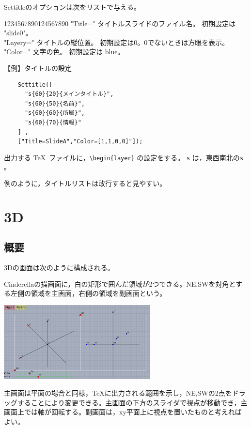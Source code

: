 \documentclass[papersize,a4paper,12pt,uplatex]{jsarticle}
\begin{document}
\begin{description}
Settitleのオプションは次をリストで与える。

\begin{tabbing}
123456789012\=4567890\=\kill
"Title=" \> タイトルスライドのファイル名。 初期設定は "slide0"。\\
"Layery=" \> タイトルの縦位置。 初期設定は0。0でないときは方眼を表示。 \\
"Color="\> 文字の色。 初期設定は blue。
\end{tabbing}

\vspace{\baselineskip}
【例】タイトルの設定

\begin{verbatim}
    Settitle([ 
      "s{60}{20}{メインタイトル}", 
      "s{60}{50}{名前}", 
      "s{60}{60}{所属}", 
      "s{60}{70}{情報}" 
    ] , 
    ["Title=SlideA","Color=[1,1,0,0]"]); 
\end{verbatim}

出力する \TeX\ ファイルに，\verb|\begin{layer}| の設定をする。 \verb|s| は，東西南北の\verb|s|  。

例のように，タイトルリストは改行すると見やすい。

\end{description}
\newpage
\section{\ketcindy 3D}
\subsection{概要}
\ketcindy 3Dの画面は次のように構成される。

Cinderellaの描画面に，白の矩形で囲んだ領域が2つできる。NE,SWを対角とする左側の領域を主画面，右側の領域を副画面という。

\vspace{\baselineskip}
\begin{center}
 \includegraphics[bb=0 0 879.05 447.02 , width=8cm]{Fig/3dstart.pdf}
\end{center}
主画面は平面の場合と同様，TeXに出力される範囲を示し，NE,SWの2点をドラッグすることにより変更できる。主画面の下方のスライダで視点が移動でき，主画面上では軸が回転する。副画面は，xy平面上に視点を置いたものと考えればよい。
\end{document}
